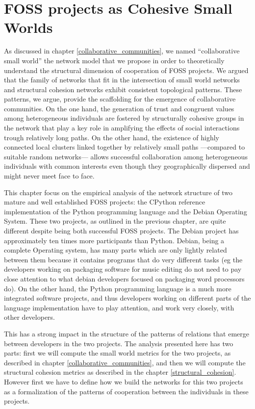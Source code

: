 \chapter{FOSS projects as Cohesive Small Worlds}
\label{cohesive_small_world}

As discussed in chapter \ref{collaborative_communities}, we named ``collaborative small world'' the network model that we propose in order to theoretically understand the structural dimension of cooperation of FOSS projects. We argued that the family of networks that fit in the intersection of small world networks and structural cohesion networks exhibit consistent topological patterns. These patterns, we argue, provide the scaffolding for the emergence of collaborative communities. On the one hand, the generation of trust and congruent values among heterogeneous individuals are fostered by structurally cohesive groups in the network that play a key role in amplifying the effects of social interactions trough relatively long paths. On the other hand, the existence of highly connected local clusters linked together by relatively small paths ---compared to suitable random networks--- allows successful collaboration among heterogeneous individuals with common interests even though they geographically dispersed and might never meet face to face.

This chapter focus on the empirical analysis of the network structure of two mature and well established FOSS projects: the CPython reference implementation of the Python programming language and the Debian Operating System. These two projects, as outlined in the previous chapter, are quite different despite being both successful FOSS projects. The Debian project has approximately ten times more participants than Python. Debian, being a complete Operating system, has many parts which are only lightly related between them because it contains programs that do very different tasks (eg the developers working on packaging software for music editing do not need to pay close attention to what debian developers focused on packaging word processors do). On the other hand, the Python programming language is a much more integrated software projects, and thus developers working on different parts of the language implementation have to play attention, and work very closely, with other developers.

This has a strong impact in the structure of the patterns of relations that emerge between developers in the two projects. The analysis presented here has two parts: first we will compute the small world metrics for the two projects, as described in chapter \ref{collaborative_communities}, and then we will compute the structural cohesion metrics as described in the chapter \ref{structural_cohesion}. However first we have to define how we build the networks for this two projects as a formalization of the patterns of cooperation between the individuals in these projects.

